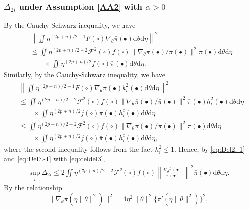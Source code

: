 \documentclass[preprint,11pt]{imsart}
\numberwithin{equation}{section}
\theoremstyle{plain}
\theoremstyle{definition}
\theoremstyle{remark}
\newcommand{\rd}{\mathrm{d}}
\begin{document}
\subsubsection{$\Delta_{2i}$ under Assumption \ref{AA2} with $\alpha>0$}
\label{sec:subsub1}
By the Cauchy-Schwarz inequality, we have
\begin{equation}\label{eq:Del2.-1}
 \begin{split}
& \left\|\iint 
  \eta^{(2p+n)/2-1} F(\circ) 
\nabla_\theta\bar{\pi}(\bullet) \rd \theta   \rd \eta \right\|^2 \\
& \leq
 \iint   \eta^{(2p+n)/2-2} \mathcal{F}^2(\circ) f(\circ)
 \|\nabla_\theta\bar{\pi}(\bullet)/\bar{\pi}(\bullet)\|^2 \bar{\pi}(\bullet) \rd \theta   \rd \eta \\
 &\qquad \times
 \iint   \eta^{(2p+n)/2} f(\circ) \bar{\pi}(\bullet) \rd \theta   \rd \eta .
\end{split}
\end{equation}
Similarly, by the Cauchy-Schwarz inequality, we have
\begin{equation}\label{eq:Del3.-1}
 \begin{split}
& \left\|\iint 
  \eta^{(2p+n)/2-1} F(\circ) 
\nabla_\theta\bar{\pi}(\bullet) h_i^2(\bullet)\rd \theta   \rd \eta \right\|^2 \\
& \leq
 \iint   \eta^{(2p+n)/2-2} \mathcal{F}^2(\circ) f(\circ)
 \|\nabla_\theta\bar{\pi}(\bullet)/\bar{\pi}(\bullet)\|^2 \bar{\pi}(\bullet)h_i^2(\bullet) \rd \theta   \rd \eta \\
 &\qquad \times
  \iint   \eta^{(2p+n)/2} f(\circ) \bar{\pi}(\bullet)h_i^2(\bullet) \rd \theta   \rd \eta \\
& \leq
 \iint   \eta^{(2p+n)/2-2} \mathcal{F}^2(\circ) f(\circ)
 \|\nabla_\theta\bar{\pi}(\bullet)/\bar{\pi}(\bullet)\|^2 \bar{\pi}(\bullet) \rd \theta   \rd \eta \\
 &\qquad \times
  \iint   \eta^{(2p+n)/2} f(\circ) \bar{\pi}(\bullet)h_i^2(\bullet) \rd \theta   \rd \eta ,
\end{split}
\end{equation}
where the second inequality follows from the fact $h_i^2\leq 1$.
Hence, by \eqref{eq:Del2.-1} and \eqref{eq:Del3.-1} with  \eqref{eq:deldel3},
\begin{align*}
\sup_i\Delta_{2i}\leq 2\iint   \eta^{(2p+n)/2-2} \mathcal{F}^2(\circ) f(\circ)
 \left\|\frac{\nabla_\theta\bar{\pi}(\bullet)}{\bar{\pi}(\bullet)}\right\|^2 \bar{\pi}(\bullet) \rd \theta   \rd \eta.
\end{align*}
By the relationship
\begin{equation}\label{eq:nablathetapi}
\|\nabla_\theta \bar{\pi}(\eta\|\theta\|^2)\|^2
=4\eta^2\|\theta\|^2\{\bar{\pi}'(\eta\|\theta\|^2)\}^2,
\end{equation}
\end{document}
